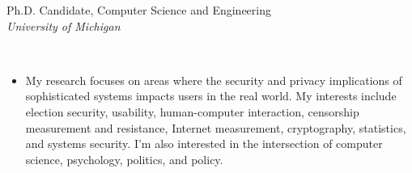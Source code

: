 \documentclass[11pt]{article}
\begin{document}
\fancyhead{}
\fancyfoot[F]{\hfill\small\thepage}
\renewcommand{\headrulewidth}{0pt}
\pagestyle{fancy}\thispagestyle{fancy}
\newcommand{\cvsection}[1]{%
  {\vspace{8pt}{\Large\bf #1}}}
\newdimen{\leftsize}
\newdimen{\rightsize}
\leftsize=0.5in
\rightsize=5.5in
\parindent=0pt
\setlength{\leftmargini}{\leftsize}
\addtolength{\leftmargini}{3pt}
\renewcommand{\labelenumi}{[\arabic{enumi}]}
\def\textsb#1{{\fontseries{sb}\selectfont #1}}

\newif\ifsocial\socialfalse
{\parbox[b]{3.55in}{
\fontsize{18pt}{22pt}\selectfont
\textbf{}\vspace{2pt}

\setlength\leftskip{0pt}\setlength\rightskip{-\leftskip}\setlength\parfillskip{\leftskip}
\raggedright

\fontsize{12pt}{16pt}\selectfont
Ph.D. Candidate, Computer Science and Engineering\\
{\textsl{University of Michigan}}
}}
\hfill
{\parbox[b]{2.0in}{\raggedleft\fontsize{10pt}{12pt}\selectfont
{}\\
\vspace{1pt}
}
\vspace{8pt}

{\fontsize{12pt}{16pt}\selectfont
    \textls[20]{{\today}}\hfill
{}%
}
}

\normalsize\selectfont
\smallskip


\vspace*{8pt}


\cvsection{Research Overview}
\vspace{-2pt}

\begin{itemize}[label={},leftmargin=0.25in,labelsep=0pt]\addtolength{\itemsep}{-0.25\baselineskip}

\item My research focuses on areas where the security and privacy implications of sophisticated systems impacts users in the real world. My interests include election security, usability, human-computer interaction, censorship measurement and resistance, Internet measurement, cryptography, statistics, and systems security. I'm also interested in the intersection of computer science, psychology, politics, and policy.

\end{itemize}
\end{document}
